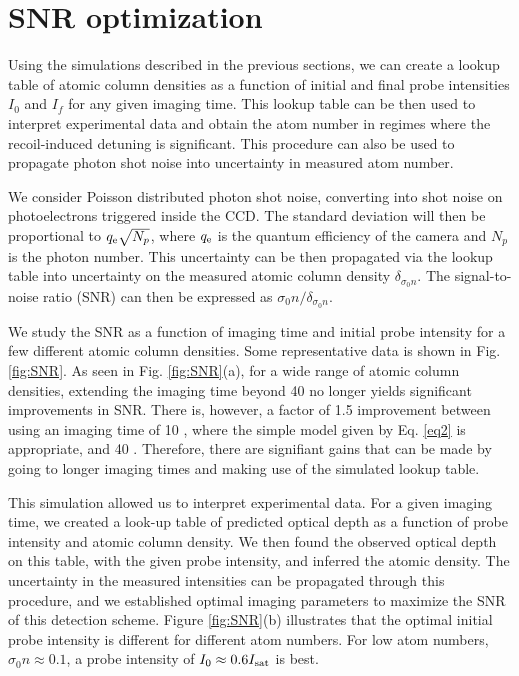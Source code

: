 \section{SNR optimization}

Using the simulations described in the previous sections, we can create a lookup table of atomic column densities as a function of initial and final probe intensities $I_0$ and $I_f$ for any given imaging time. This lookup table can be then used to interpret experimental data and obtain the atom number in regimes where the recoil-induced detuning is significant. This procedure can also be used to propagate photon shot noise into uncertainty in measured atom number. 

We consider Poisson distributed photon shot noise, converting into shot noise on photoelectrons triggered inside the CCD. The standard deviation will then be proportional to $q_{\rm{e}}\sqrt{N_p}$, where $q_{\rm{e}}$ is the quantum efficiency of the camera and $N_p$ is the photon number. This uncertainty can be then propagated via the lookup table into uncertainty on the measured atomic column density $\delta_{\sigma_0 n}$. The signal-to-noise ratio (SNR) can then be expressed as $\sigma_0 n/\delta_{\sigma_0 n}$.

We study the SNR as a function of imaging time and initial probe intensity for a few different atomic column densities. Some representative data is shown in  Fig. \ref{fig:SNR}. As seen in Fig. \ref{fig:SNR}(a), for a wide range of atomic column densities, extending the imaging time beyond 40 \us{} no longer yields significant improvements in SNR. There is, however, a factor of 1.5 improvement between using an imaging time of 10 \us{}, where the simple model given by Eq. \ref{eq2} is appropriate, and 40 \us{}. Therefore, there are signifiant gains that can be made by going to longer imaging times and making use of the simulated lookup table.  


This simulation allowed us to interpret experimental data. For a given imaging time, we created a look-up table of predicted optical depth as a function of probe intensity and atomic column density. We then found the observed optical depth on this table, with the given probe intensity, and inferred the atomic density. The uncertainty in the measured intensities can be propagated through this procedure, and we established optimal imaging parameters to maximize the SNR of this detection scheme. Figure \ref{fig:SNR}(b) illustrates that the optimal initial probe intensity is different for different atom numbers. For low atom numbers, $\sigma_0 n\approx0.1$, a probe intensity of $I_0\approx0.6 I_{\rm{sat}}$ is best.


